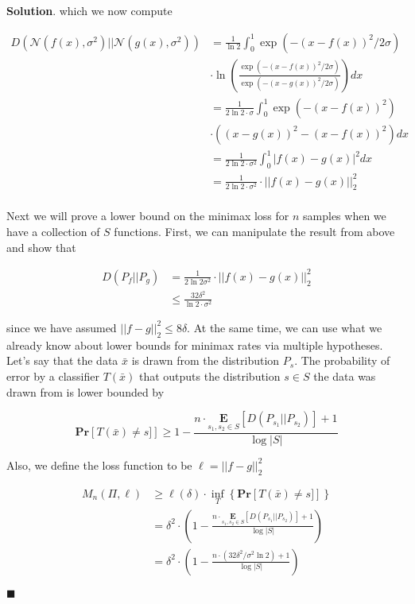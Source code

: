 \documentclass[12pt]{article}
\theoremstyle{definition}
\newenvironment{s}{%
        \begin{trivlist} \item \textbf{Solution}. }{%
            \hspace*{\fill} $\blacksquare$\end{trivlist}}%
\begin{document}
{\begin{s}
which we now compute

\begin{align*}
D(\mathcal{N}(f(x),\sigma^{2})||\mathcal{N}(g(x),\sigma^{2})) &= 
\frac{1}{\ln 2}\int_{0}^{1} \exp\left(-(x-f(x))^{2}/2\sigma\right)\\ &\cdot \ln \left(\frac{\exp\left(-(x-f(x))^{2}/2\sigma\right)}{\exp\left(-(x-g(x))^{2}/2\sigma\right)}\right)dx\\
&= \frac{1}{2\ln 2\cdot \sigma}\int_{0}^{1} \exp\left(-(x-f(x))^{2}\right)\\ &\cdot \left((x-g(x))^{2}-(x-f(x))^{2}\right)dx\\
&= \frac{1}{2\ln 2\cdot \sigma^{2}}\int_{0}^{1} |f(x)-g(x)|^{2}dx\\
&= \frac{1}{2\ln 2\cdot \sigma^{2}}\cdot ||f(x)-g(x)||_{2}^{2}\\
\end{align*}

Next we will prove a lower bound on the minimax loss for $n$ samples when we have a collection of $S$ functions. First, we can manipulate the result from above and show that

\begin{align*}
D(P_{f}||P_{g}) &= \frac{1}{2\ln 2\sigma^{2}}\cdot ||f(x)-g(x)||_{2}^{2} \\
&\leq \frac{32\delta^{2}}{\ln 2\cdot \sigma^{2}}
\end{align*}

since we have assumed $||f-g||_{2}^{2} \leq 8\delta$. At the same time, we can use what we already know about lower bounds for minimax rates via multiple hypotheses. Let's say that the data $\bar{x}$ is drawn from the distribution $P_{s}$. The probability of error by a classifier $T(\bar{x})$ that outputs the distribution $s\in S$ the data was drawn from is lower bounded by

\begin{equation*}
\mathbf{Pr}\left[T(\bar{x}) \neq s]\right] \geq 1 - \frac{n\cdot \underset{s_{1},s_{2}\in S}{\mathbf{E}}\left[D(P_{s_{1}}||P_{s_{2}})\right] + 1}{\log |S|}
\end{equation*}

Also, we define the loss function to be $\ell = ||f-g||_{2}^{2}$

\begin{align*}
M_{n}(\Pi, \ell) &\geq \ell(\delta)\cdot \underset{T}{\inf}\left\{\mathbf{Pr}\left[T(\bar{x}) \neq s]\right]\right\}\\
&= \delta^{2}\cdot\left(1 - \frac{n\cdot \underset{s_{1},s_{2}\in S}{\mathbf{E}}\left[D(P_{s_{1}}||P_{s_{2}})\right] + 1}{\log |S|}\right)\\
&= \delta^{2}\cdot\left(1 - \frac{n\cdot \left(32\delta^{2}/\sigma^{2}\ln 2\right) + 1}{\log |S|}\right)
\end{align*}


\end{s}}
\end{document}
